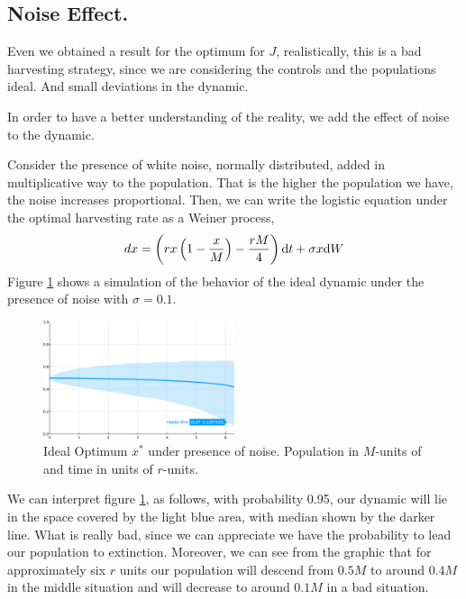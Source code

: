 \subsection{Noise Effect.}
Even we obtained a result for the optimum for $J$, realistically, this is a bad harvesting strategy, since we are considering the controls and the populations ideal. And small deviations in the dynamic.

In order to have a better understanding of the reality, we add the effect of noise to the dynamic.


Consider the presence of white noise, normally distributed, added in multiplicative way to the population. That is the higher the population we have, the noise increases proportional. Then, we can write the logistic equation under the optimal harvesting rate as a Weiner process,
\begin{equation}
dx=\left(rx\left(1-\frac{x}{M}\right)-\frac{rM}{4}\right)\mathrm{d} t+\sigma x\mathrm{d} W \label{eq: Constant Harvesting Stochastic Control}
\end{equation}
Figure \ref{fig: NoiseIdealConstant} shows a simulation of the behavior of the ideal dynamic under the presence of noise with $\sigma=0.1$.

\begin{figure}[H]	
	\begin{center}
	\includegraphics[width=0.5\textwidth]{NoiseIdealDynamic.png}
	\caption{Ideal Optimum $x^*$ under presence of noise. Population in $M$-units of  and time in units of $r$-units.}
	\label{fig: NoiseIdealConstant}
	\end{center}
\end{figure}

We can interpret figure \ref{fig: NoiseIdealConstant}, as follows, with probability 0.95, our dynamic will lie in the space covered by the light blue area, with median shown by the darker line. What is really bad, since we can appreciate we have the probability to lead our population to extinction. Moreover, we can see from the graphic that for approximately six $r$ units our population will descend from $0.5M$ to around $0.4M$ in the middle situation and will decrease to around $0.1M$ in a bad situation.

